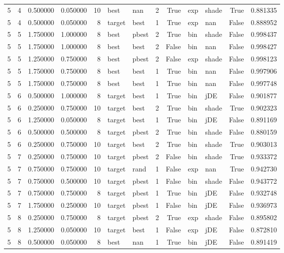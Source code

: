 \begin{tabular}{rrrrrllrrllrr}
5 & 4 & 0.500000 & 0.050000 & 10 & best & nan & 2 & True & exp & shade & True & 0.881335 \\
5 & 4 & 0.500000 & 0.050000 & 8 & target & best & 1 & True & exp & nan & False & 0.888952 \\
5 & 5 & 1.750000 & 1.000000 & 8 & best & pbest & 2 & True & bin & shade & False & 0.998437 \\
5 & 5 & 1.750000 & 1.000000 & 8 & best & best & 2 & False & bin & nan & False & 0.998427 \\
5 & 5 & 1.250000 & 0.750000 & 8 & best & pbest & 2 & False & exp & shade & False & 0.998123 \\
5 & 5 & 1.750000 & 0.750000 & 8 & best & best & 1 & True & bin & nan & False & 0.997906 \\
5 & 5 & 1.750000 & 0.750000 & 8 & best & best & 1 & True & bin & nan & False & 0.997748 \\
5 & 6 & 0.500000 & 1.000000 & 8 & target & best & 1 & True & bin & jDE & False & 0.901877 \\
5 & 6 & 0.250000 & 0.750000 & 10 & target & best & 2 & True & bin & shade & True & 0.902323 \\
5 & 6 & 1.250000 & 0.050000 & 8 & target & best & 1 & True & bin & jDE & False & 0.891169 \\
5 & 6 & 0.500000 & 0.500000 & 8 & target & pbest & 2 & True & bin & shade & False & 0.880159 \\
5 & 6 & 0.250000 & 0.750000 & 10 & target & best & 2 & True & bin & shade & True & 0.903013 \\
5 & 7 & 0.250000 & 0.750000 & 10 & target & pbest & 2 & False & bin & shade & True & 0.933372 \\
5 & 7 & 0.750000 & 0.750000 & 10 & target & rand & 1 & False & exp & nan & True & 0.942730 \\
5 & 7 & 0.750000 & 0.500000 & 10 & target & pbest & 1 & False & bin & shade & False & 0.943772 \\
5 & 7 & 0.750000 & 0.750000 & 8 & target & pbest & 1 & True & bin & jDE & False & 0.932748 \\
5 & 7 & 1.750000 & 0.250000 & 10 & target & pbest & 1 & False & bin & jDE & False & 0.936973 \\
5 & 8 & 0.250000 & 0.750000 & 8 & target & pbest & 2 & True & exp & shade & False & 0.895802 \\
5 & 8 & 1.250000 & 0.050000 & 10 & target & best & 1 & False & exp & jDE & False & 0.872810 \\
5 & 8 & 0.500000 & 0.050000 & 8 & best & nan & 1 & True & bin & jDE & False & 0.891419 \\

\end{tabular}
